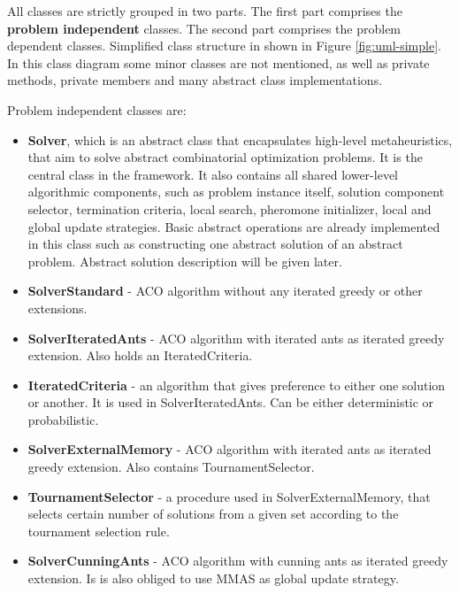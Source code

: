 \documentclass[12pt,a4paper,oneside]{book}
\begin{document}
All classes are strictly grouped in two parts. The first part comprises the \textbf{problem independent} classes. The second part comprises the problem dependent classes. Simplified class structure in shown in Figure \ref{fig:uml-simple}. In this class diagram some minor classes are not mentioned, as well as private methods, private members and many abstract class implementations.

Problem independent classes are:

\begin{itemize}
\item \textbf{Solver}, which is an abstract class that encapsulates high-level metaheuristics, that aim to solve abstract combinatorial optimization problems. It is the central class in the framework. It also contains all shared lower-level algorithmic components, such as problem instance itself, solution component selector, termination criteria, local search, pheromone initializer, local and global update strategies. Basic abstract operations are already implemented in this class such as constructing one abstract solution of an abstract problem. Abstract solution description will be given later.

\item \textbf{SolverStandard} - ACO algorithm without any iterated greedy or other extensions.

\item \textbf{SolverIteratedAnts} - ACO algorithm with iterated ants as iterated greedy extension. Also holds an IteratedCriteria.

\item \textbf{IteratedCriteria} - an algorithm that gives preference to either one solution or another. It is used in SolverIteratedAnts. Can be either deterministic or probabilistic.

\item \textbf{SolverExternalMemory} - ACO algorithm with iterated ants as iterated greedy extension. Also contains TournamentSelector.

\item \textbf{TournamentSelector} - a procedure used in SolverExternalMemory, that selects certain number of solutions from a given set according to the tournament selection rule.

\item \textbf{SolverCunningAnts} - ACO algorithm with cunning ants as iterated greedy extension. Is is also obliged to use MMAS as global update strategy.


\end{itemize}
\end{document}
